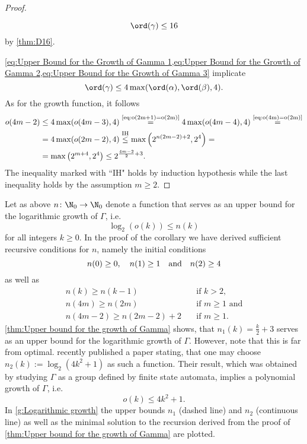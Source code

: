 \begin{proof}
\begin{clist}
\begin{equation}
\ord(\gamma)\leq 16
\end{equation}
by \cref{thm:D16}.
\end{clist}
\cref{eq:Upper Bound for the Growth of Gamma 1,eq:Upper Bound for the Growth of Gamma 2,eq:Upper Bound for the Growth of Gamma 3} implicate
\begin{equation*}
\ord(\gamma)\leq4\max(\ord(\alpha), \ord(\beta), 4).
\end{equation*}
As for the growth function, it follows
\begin{align*}
o(4m-2)	&\leq 4\max(o(4m-3),4)\overset{\text{\cref{eq:o(2m+1)=o(2m)}}}{=} 4\max(o(4m-4),4)\overset{\text{\cref{eq:o(4m)=o(2m)}}}{=}\\
		&=4\max(o(2m-2),4)\overset{\text{IH}}{\leq} \max\left(2^{n(2m-2)+2}, 2^4\right)=\\
		&=\max\left(2^{m+4},2^4\right)\leq 2^{\frac{4m-2}{2}+3}.
\end{align*}
The inequality marked with ``IH" holds by induction hypothesis while the last inequality holds by the assumption $m\geq 2$.
\end{proof}

Let as above $n\colon\N_0\to\N_0$ denote a function that serves as an upper bound for the logarithmic growth of $\Gamma$, i.e.
\begin{equation*}
\log_2(o(k))\leq n(k)
\end{equation*}
for all integers $k\geq 0$. In the proof of the corollary we have derived sufficient recursive conditions for $n$, namely the initial conditions
\begin{equation*}
n(0)\geq 0,\quad n(1)\geq 1\quad \text{and}\quad n(2)\geq 4\\
\end{equation*}
as well as
\begin{align*}
n(k)\geq n(k-1)&\quad\text{if } k>2,\\
n(4m)\geq n(2m)&\quad\text{if } m\geq 1\text{ and}\\
n(4m-2)\geq n(2m-2)+2&\quad\text{if } m\geq 1.
\end{align*}
\cref{thm:Upper bound for the growth of Gamma} shows, that $n_1(k)=\frac{k}{2}+3$ serves as an upper bound for the logarithmic growth of $\Gamma$. However, note that this is far from optimal. \textcite{2006math} recently published a paper stating, that one may choose $n_2(k):=\log_2(4k^2+1)$ as such a function. Their result, which was obtained by studying $\Gamma$ as a group defined by finite state automata, implies a polynomial growth of $\Gamma$, i.e.
\begin{equation*}
o(k)\leq 4k^2+1.
\end{equation*}
In \cref{g:Logarithmic growth} the upper bounds $n_1$ (dashed line) and $n_2$ (continuous line) as well as the minimal solution to the recursion derived from the proof of \cref{thm:Upper bound for the growth of Gamma} are plotted. 

